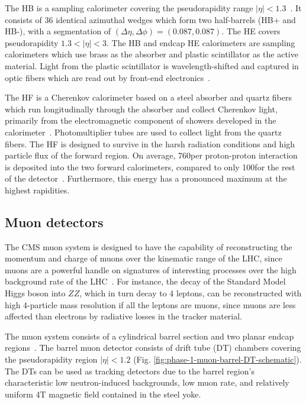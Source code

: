The HB is a sampling calorimeter covering the pseudorapidity range $|\eta| < 1.3$~\cite{CMS-2008-JINST-3-S08004}. It consists of 36 identical azimuthal wedges which form two half-barrels (HB+ and HB-), with a segmentation of $(\Delta \eta, \Delta \phi) = (0.087, 0.087)$. The HE covers pseudorapidity $1.3 < |\eta| < 3$. The HB and endcap HE calorimeters are sampling calorimeters which use brass as the absorber and plastic scintillator as the active material. Light from the plastic scintillator is wavelength-shifted and captured in optic fibers which are read out by front-end electronics~\cite{CMS-TDR-010-2012}. 

The HF is a Cherenkov calorimeter based on a steel absorber and quartz fibers which run longitudinally through the absorber and collect Cherenkov light, primarily from the electromagnetic component of showers developed in the calorimeter~\cite{CMS-TDR-010-2012}. Photomultiplier tubes are used to  collect light from the quartz fibers. The HF is designed to survive in the harsh radiation conditions and high particle flux of the forward region. On average, 760\GeV per proton-proton interaction is deposited into the two forward calorimeters, compared to only 100\GeV for the rest of the detector~\cite{CMS-2008-JINST-3-S08004}. Furthermore, this energy has a pronounced maximum at the highest rapidities.

\subsection{Muon detectors}
The CMS muon system is designed to have the capability of reconstructing the momentum and charge of muons over the kinematic range of the LHC, since muons are a powerful handle on signatures of interesting processes over the high background rate of the LHC~\cite{CMS-2008-JINST-3-S08004}. For instance, the decay of the Standard Model Higgs boson into $ZZ$, which in turn decay to 4 leptons, can be reconstructed with high 4-particle mass resolution if all the leptons are muons, since muons are less affected than electrons by radiative losses in the tracker material. 

The muon system consists of a cylindrical barrel section and two planar endcap regions~\cite{CMS-2008-JINST-3-S08004}. The barrel muon detector consists of drift tube (DT) chambers covering the pseudorapidity region $|\eta| < 1.2$ (Fig. \ref{fig:phase-1-muon-barrel-DT-schematic}). The DTs can be used as tracking detectors due to the barrel region's characteristic low neutron-induced backgrounds, low muon rate, and relatively uniform 4T magnetic field contained in the steel yoke. 

